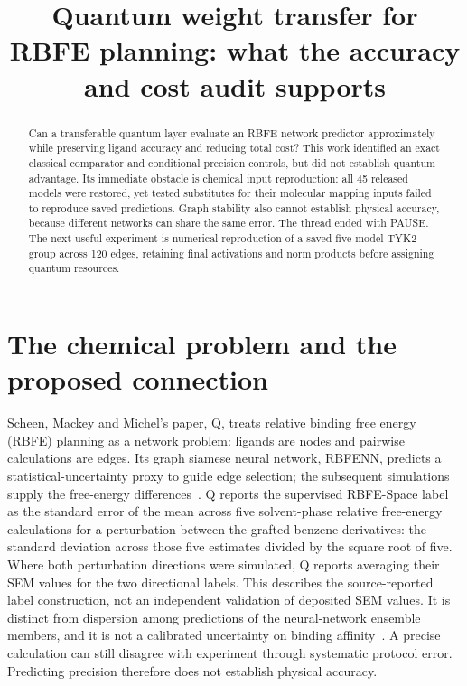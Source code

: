 \documentclass{article}
\title{Quantum weight transfer for RBFE planning: what the accuracy and cost audit supports}
\begin{document}
\maketitle

\begin{abstract}
Can a transferable quantum layer evaluate an RBFE network predictor approximately while preserving ligand accuracy and reducing total cost? This work identified an exact classical comparator and conditional precision controls, but did not establish quantum advantage. Its immediate obstacle is chemical input reproduction: all 45 released models were restored, yet tested substitutes for their molecular mapping inputs failed to reproduce saved predictions. Graph stability also cannot establish physical accuracy, because different networks can share the same error. The thread ended with PAUSE. The next useful experiment is numerical reproduction of a saved five-model TYK2 group across 120 edges, retaining final activations and norm products before assigning quantum resources.
\end{abstract}

\section{The chemical problem and the proposed connection}

Scheen, Mackey and Michel's paper, Q, treats relative binding free energy (RBFE) planning as a network problem: ligands are nodes and pairwise calculations are edges. Its graph siamese neural network, RBFENN, predicts a statistical-uncertainty proxy to guide edge selection; the subsequent simulations supply the free-energy differences~\cite{Q}. Q reports the supervised RBFE-Space label as the standard error of the mean across five solvent-phase relative free-energy calculations for a perturbation between the grafted benzene derivatives: the standard deviation across those five estimates divided by the square root of five. Where both perturbation directions were simulated, Q reports averaging their SEM values for the two directional labels. This describes the source-reported label construction, not an independent validation of deposited SEM values. It is distinct from dispersion among predictions of the neural-network ensemble members, and it is not a calibrated uncertainty on binding affinity~\cite{Q}. A precise calculation can still disagree with experiment through systematic protocol error. Predicting precision therefore does not establish physical accuracy.
\end{document}
